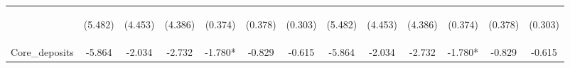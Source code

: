 \documentclass[]{article}
\begin{document}
\begin{center}
\begin{tabular}{lcccccccccccc}
\vspace{4pt} & \begin{footnotesize}(5.482)\end{footnotesize} & \begin{footnotesize}(4.453)\end{footnotesize} & \begin{footnotesize}(4.386)\end{footnotesize} & \begin{footnotesize}(0.374)\end{footnotesize} & \begin{footnotesize}(0.378)\end{footnotesize} & \begin{footnotesize}(0.303)\end{footnotesize} & \begin{footnotesize}(5.482)\end{footnotesize} & \begin{footnotesize}(4.453)\end{footnotesize} & \begin{footnotesize}(4.386)\end{footnotesize} & \begin{footnotesize}(0.374)\end{footnotesize} & \begin{footnotesize}(0.378)\end{footnotesize} & \begin{footnotesize}(0.303)\end{footnotesize} \\
Core\_deposits & -5.864 & -2.034 & -2.732 & -1.780* & -0.829 & -0.615 & -5.864 & -2.034 & -2.732 & -1.780* & -0.829 & -0.615 \\

\end{tabular}
\end{center}
\end{document}

